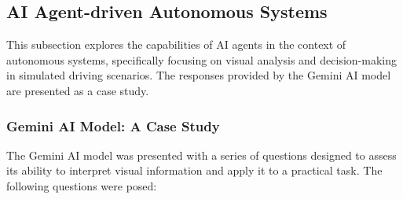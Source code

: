 





\subsection{AI Agent-driven Autonomous Systems}

This subsection explores the capabilities of AI agents in the context of autonomous systems, specifically focusing on visual analysis and decision-making in simulated driving scenarios. The responses provided by the Gemini AI model are presented as a case study.

\subsubsection{Gemini AI Model: A Case Study}

The Gemini AI model was presented with a series of questions designed to assess its ability to interpret visual information and apply it to a practical task. The following questions were posed:

